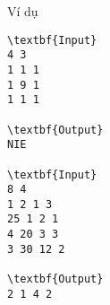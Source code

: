 Ví dụ
\begin{verbatim}
\textbf{Input}
4 3
1 1 1
1 9 1
1 1 1

\textbf{Output}
NIE

\textbf{Input}
8 4
1 2 1 3
25 1 2 1
4 20 3 3
3 30 12 2

\textbf{Output}
2 1 4 2
\end{verbatim}
